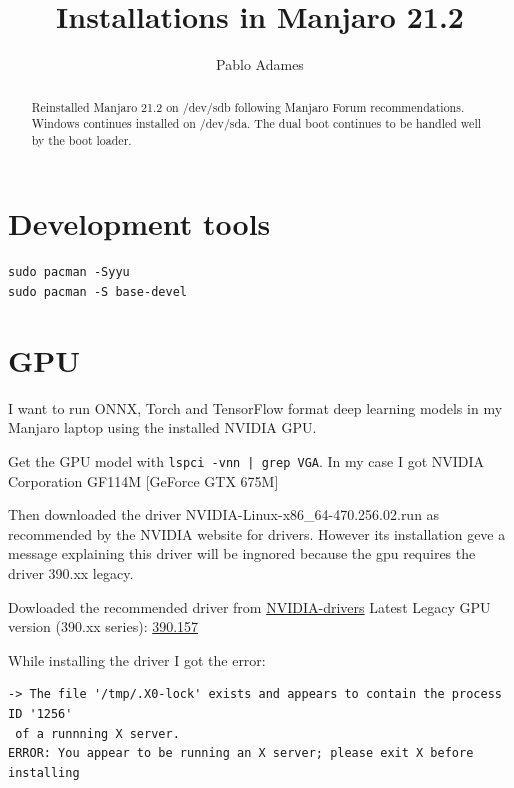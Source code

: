 \documentclass[]{scrartcl}
\title{Installations in Manjaro 21.2}
\author{Pablo Adames}
\begin{document}
\maketitle

\begin{abstract}
Reinstalled Manjaro 21.2 on /dev/sdb following Manjaro Forum recommendations.
Windows continues installed on /dev/sda.
The dual boot continues to be handled well by the boot loader.
\end{abstract}

\section{Development tools}

\begin{verbatim}
sudo pacman -Syyu
sudo pacman -S base-devel
\end{verbatim}


\section{GPU}
\label{sec:gpu}

I want to run ONNX, Torch and TensorFlow format deep learning models in my Manjaro laptop using the installed NVIDIA GPU.

\begin{list}{\color{teal}\clubsuit}{\color{olive}}
	\item Get the GPU model with \color{black}\texttt{lspci -vnn | grep VGA}. \color{olive} In my case I got \color{black} NVIDIA Corporation GF114M [GeForce GTX 675M]\color{olive} 
	\item Then downloaded the driver \color{black} NVIDIA-Linux-x86\_64-470.256.02.run \color{olive} as recommended by the NVIDIA website for drivers. However its installation geve a message explaining this driver will be ingnored because the gpu requires the driver \color{black}390.xx legacy.\color{olive}
	\item Dowloaded the recommended driver from \href{https://www.nvidia.com/en-us/drivers/unix/}{NVIDIA-drivers} \color{black} Latest Legacy GPU version (390.xx series): \href{https://www.nvidia.com/Download/driverResults.aspx/196213/en-us/}{390.157} \color{olive} 
\end{list}


While  installing the driver I got the error:

\begin{verbatim}
-> The file '/tmp/.X0-lock' exists and appears to contain the process ID '1256'
 of a runnning X server.
ERROR: You appear to be running an X server; please exit X before installing
\end{verbatim}
\end{document}
